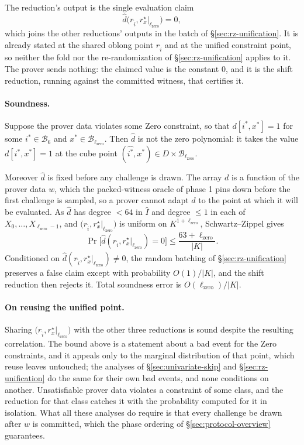 \documentclass{article}
\theoremstyle{definition}
\newcommand{\BB}{\mathcal{B}}
\begin{document}
The reduction's output is the single evaluation claim
\[
  \widehat{d}\bigl( r_{\widehat{i}}, r^\star_x|_{\ell_\text{zero}} \bigr) = 0,
\]
which joins the other reductions' outputs in the batch of \S\ref{sec:rz-unification}. It is already stated at the shared oblong point $r_{\widehat{i}}$ and at the unified constraint point, so neither the fold nor the re-randomization of \S\ref{sec:rz-unification} applies to it. The prover sends nothing: the claimed value is the constant $0$, and it is the shift reduction, running against the committed witness, that certifies it.

\paragraph{Soundness.}
Suppose the prover data violates some Zero constraint, so that $d[i^*, x^*] = 1$ for some $i^* \in \BB_6$ and $x^* \in \BB_{\ell_\text{zero}}$. Then $\widehat{d}$ is not the zero polynomial: it takes the value $d[i^*, x^*] = 1$ at the cube point $(\widehat{i^*}, x^*) \in D \times \BB_{\ell_\text{zero}}$.

Moreover $\widehat{d}$ is fixed before any challenge is drawn. The array $d$ is a function of the prover data $w$, which the packed-witness oracle of phase 1 pins down before the first challenge is sampled, so a prover cannot adapt $d$ to the point at which it will be evaluated. As $\widehat{d}$ has degree $< 64$ in $\widehat{I}$ and degree $\leq 1$ in each of $X_0, \ldots, X_{\ell_\text{zero} - 1}$, and $\bigl( r_{\widehat{i}}, r^\star_x|_{\ell_\text{zero}} \bigr)$ is uniform on $K^{1 + \ell_\text{zero}}$, Schwartz--Zippel gives
\[
  \Pr\bigl[ \widehat{d}(r_{\widehat{i}}, r^\star_x|_{\ell_\text{zero}}) = 0 \bigr] \leq \frac{63 + \ell_\text{zero}}{|K|}.
\]
Conditioned on $\widehat{d}(r_{\widehat{i}}, r^\star_x|_{\ell_\text{zero}}) \neq 0$, the random batching of \S\ref{sec:rz-unification} preserves a false claim except with probability $O(1) / |K|$, and the shift reduction then rejects it. Total soundness error is $O(\ell_\text{zero}) / |K|$.

\paragraph{On reusing the unified point.}
Sharing $\bigl( r_{\widehat{i}}, r^\star_x|_{\ell_\text{zero}} \bigr)$ with the other three reductions is sound despite the resulting correlation. The bound above is a statement about a bad event for the Zero constraints, and it appeals only to the marginal distribution of that point, which reuse leaves untouched; the analyses of \S\ref{sec:univariate-skip} and \S\ref{sec:rz-unification} do the same for their own bad events, and none conditions on another. Unsatisfiable prover data violates a constraint of some class, and the reduction for that class catches it with the probability computed for it in isolation. What all these analyses do require is that every challenge be drawn after $w$ is committed, which the phase ordering of \S\ref{sec:protocol-overview} guarantees.
\end{document}

